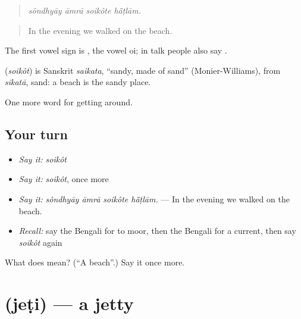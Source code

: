 \begin{quote}
   
\end{quote}

\begin{quote}
\emph{sôndhyāy āmrā soikôte hā̃ṭlām.}
\end{quote}

\begin{quote}
In the evening we walked on the beach.
\end{quote}

The first vowel sign is , the vowel oi; in talk people also say  .

\begin{cousinweb}
\textbf{} (\emph{soikôt}) is Sanskrit \emph{saikata}, \textquotedblleft{}sandy, made of sand\textquotedblright{} (Monier-Williams), from \emph{sikatā}, sand: a beach is the sandy place.
\end{cousinweb}

\begin{grammarlens}[title={What you've built}]
One more word for getting around.
\end{grammarlens}

\subsection*{Your turn}
\begin{itemize}
\raggedright
  \item \emph{Say it:} \emph{soikôt}
  \item \emph{Say it:} \emph{soikôt}, once more
  \item \emph{Say it:} \emph{sôndhyāy āmrā soikôte hā̃ṭlām.} — In the evening we walked on the beach.
  \item \emph{Recall:} say the Bengali for to moor, then the Bengali for a current, then say \emph{soikôt} again
\end{itemize}

\begin{tcolorbox}[breakable,colback=teal!4,colframe=teal!35!black,title={Before you move on}]
What does  mean? (\textquotedblleft{}A beach\textquotedblright{}.) Say it once more.
\end{tcolorbox}
\section[\texorpdfstring{\bn{জেটি} (jeṭi)}{জেটি (jeṭi)}]{ (jeṭi) — a jetty}

